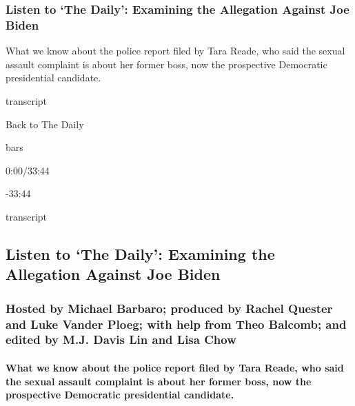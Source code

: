 \hypertarget{listen-to-the-daily-examining-the-allegation-against-joe-biden}{%
\subsubsection{Listen to `The Daily': Examining the Allegation Against
Joe
Biden}\label{listen-to-the-daily-examining-the-allegation-against-joe-biden}}

What we know about the police report filed by Tara Reade, who said the
sexual assault complaint is about her former boss, now the prospective
Democratic presidential candidate.

transcript

Back to The Daily

bars

0:00/33:44

-33:44

transcript

\hypertarget{listen-to-the-daily-examining-the-allegation-against-joe-biden-1}{%
\subsection{Listen to `The Daily': Examining the Allegation Against Joe
Biden}\label{listen-to-the-daily-examining-the-allegation-against-joe-biden-1}}

\hypertarget{hosted-by-michael-barbaro-produced-by-rachel-quester-and-luke-vander-ploeg-with-help-from-theo-balcomb-and-edited-by-mj-davis-lin-and-lisa-chow}{%
\subsubsection{Hosted by Michael Barbaro; produced by Rachel Quester and
Luke Vander Ploeg; with help from Theo Balcomb; and edited by M.J. Davis
Lin and Lisa
Chow}\label{hosted-by-michael-barbaro-produced-by-rachel-quester-and-luke-vander-ploeg-with-help-from-theo-balcomb-and-edited-by-mj-davis-lin-and-lisa-chow}}

\hypertarget{what-we-know-about-the-police-report-filed-by-tara-reade-who-said-the-sexual-assault-complaint-is-about-her-former-boss-now-the-prospective-democratic-presidential-candidate}{%
\paragraph{What we know about the police report filed by Tara Reade, who
said the sexual assault complaint is about her former boss, now the
prospective Democratic presidential
candidate.}\label{what-we-know-about-the-police-report-filed-by-tara-reade-who-said-the-sexual-assault-complaint-is-about-her-former-boss-now-the-prospective-democratic-presidential-candidate}}

